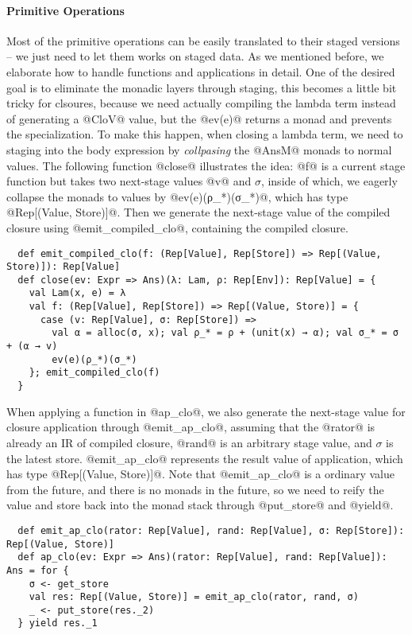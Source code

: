 \paragraph{Primitive Operations} Most of the primitive operations can be easily
translated to their staged versions -- we just need to let them works on staged data.
As we mentioned before, we elaborate how to handle functions and applications in
detail. One of the desired goal is to eliminate the monadic layers through
staging, this becomes a little bit tricky for clsoures, because we need actually
compiling the lambda term instead of generating a @CloV@ value, but the @ev(e)@
returns a monad and prevents the specialization. To make this happen, when
closing a lambda term, we need to staging into the body expression by
\textit{collpasing} the @AnsM@ monads to normal values. The
following function @close@ illustrates the idea: @f@ is a current stage function
but takes two next-stage values @v@ and $\sigma$, inside of which, we eagerly
collapse the monads to values by @ev(e)(ρ_*)(σ_*)@, which has type
@Rep[(Value, Store)]@. Then we generate the next-stage value of the compiled
closure using @emit_compiled_clo@, containing the compiled closure.

\begin{lstlisting}
  def emit_compiled_clo(f: (Rep[Value], Rep[Store]) => Rep[(Value, Store)]): Rep[Value]
  def close(ev: Expr => Ans)(λ: Lam, ρ: Rep[Env]): Rep[Value] = {
    val Lam(x, e) = λ
    val f: (Rep[Value], Rep[Store]) => Rep[(Value, Store)] = {
      case (v: Rep[Value], σ: Rep[Store]) =>
        val α = alloc(σ, x); val ρ_* = ρ + (unit(x) → α); val σ_* = σ + (α → v)
        ev(e)(ρ_*)(σ_*)
    }; emit_compiled_clo(f)
  }
\end{lstlisting}

When applying a function in @ap_clo@, we also generate the next-stage value
for closure application through @emit_ap_clo@, assuming that the @rator@ is already an
IR of compiled closure, @rand@ is an arbitrary stage value, and $\sigma$ is the
latest store. @emit_ap_clo@ represents the result value of application, which has type
@Rep[(Value, Store)]@. Note that @emit_ap_clo@ is a ordinary value from the
future, and there is no monads in the future, so we need to reify the value and
store back into the monad stack through @put_store@ and @yield@.

\begin{lstlisting}
  def emit_ap_clo(rator: Rep[Value], rand: Rep[Value], σ: Rep[Store]): Rep[(Value, Store)]
  def ap_clo(ev: Expr => Ans)(rator: Rep[Value], rand: Rep[Value]): Ans = for {
    σ <- get_store
    val res: Rep[(Value, Store)] = emit_ap_clo(rator, rand, σ)
    _ <- put_store(res._2)
  } yield res._1
\end{lstlisting}

